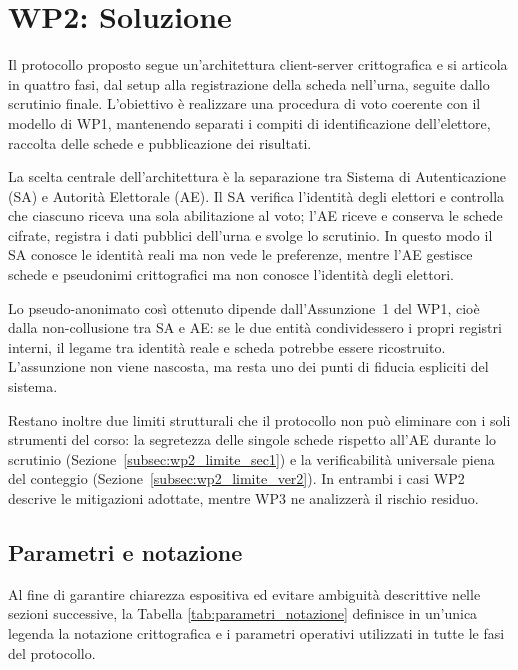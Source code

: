 \chapter{WP2: Soluzione}
\label{ch:wp2}

Il protocollo proposto segue un'architettura client-server crittografica e si articola in quattro fasi, dal setup alla registrazione della scheda nell'urna, seguite dallo scrutinio finale. L'obiettivo è realizzare una procedura di voto coerente con il modello di WP1, mantenendo separati i compiti di identificazione dell'elettore, raccolta delle schede e pubblicazione dei risultati.

La scelta centrale dell'architettura è la separazione tra Sistema di Autenticazione (SA) e Autorità Elettorale (AE). Il SA verifica l'identità degli elettori e controlla che ciascuno riceva una sola abilitazione al voto; l'AE riceve e conserva le schede cifrate, registra i dati pubblici dell'urna e svolge lo scrutinio. In questo modo il SA conosce le identità reali ma non vede le preferenze, mentre l'AE gestisce schede e pseudonimi crittografici ma non conosce l'identità degli elettori.

Lo pseudo-anonimato così ottenuto dipende dall'Assunzione~1 del WP1, cioè dalla non-collusione tra SA e AE: se le due entità condividessero i propri registri interni, il legame tra identità reale e scheda potrebbe essere ricostruito. L'assunzione non viene nascosta, ma resta uno dei punti di fiducia espliciti del sistema.

Restano inoltre due limiti strutturali che il protocollo non può eliminare con i soli strumenti del corso: la segretezza delle singole schede rispetto all'AE durante lo scrutinio (Sezione~\ref{subsec:wp2_limite_sec1}) e la verificabilità universale piena del conteggio (Sezione~\ref{subsec:wp2_limite_ver2}). In entrambi i casi WP2 descrive le mitigazioni adottate, mentre WP3 ne analizzerà il rischio residuo.


\section{Parametri e notazione}
\label{sec:parametri_notazione}

Al fine di garantire chiarezza espositiva ed evitare ambiguità descrittive nelle sezioni successive, la Tabella \ref{tab:parametri_notazione} definisce in un'unica legenda la notazione crittografica e i parametri operativi utilizzati in tutte le fasi del protocollo.

